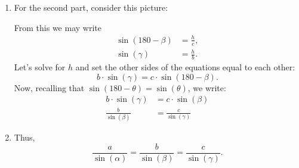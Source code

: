 \documentclass[noauthor,nooutcomes,handout,hints]{ximera}
\begin{document}
\begin{question}
\begin{freeResponse}
\begin{enumerate}
    \item For the second part, consider this picture:
    \begin{center}
    \end{center}
    From this we may write
    \begin{align*}
      \sin(180-\beta) &= \frac{h}{c},\\
      \sin(\gamma) &= \frac{h}{b}.
    \end{align*}
    Let's solve for $h$ and set the other sides of the equations equal
    to each other:
    \[
    b\cdot\sin(\gamma) = c\cdot \sin(180-\beta).
    \]
    Now, recalling that $\sin(180-\theta) = \sin(\theta)$, we write:
    \begin{align*}
      b\cdot\sin(\gamma) &= c\cdot \sin(\beta)\\
      \frac{b}{\sin(\beta)} &= \frac{c}{\sin(\gamma)}
    \end{align*}
    \item Thus,
    \[
    \frac{a}{\sin(\alpha)} = \frac{b}{\sin(\beta)} = \frac{c}{\sin(\gamma)}.
    \]  
    \end{enumerate}
  \end{freeResponse}
\end{question}
\mynewpage
\end{document}
